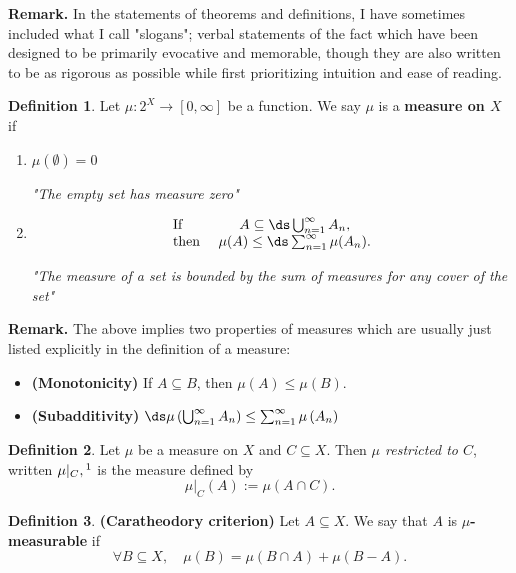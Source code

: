 \documentclass[a5paper]{article}
\theoremstyle{definition}%
\newtheorem*{definition*}{Definition}
\numberwithin{exercise}{section}
\theoremstyle{remark}%
\renewcommand{\measure}[1]{\mu\left(#1\right)}
\begin{document}
\noindent \textbf{Remark.}
In the statements of theorems and definitions, I have sometimes included what I call "slogans"; verbal statements of the fact which have been designed to be primarily evocative and memorable, though they are also written to be as rigorous as possible while first prioritizing intuition and ease of reading. 

\begin{highlight}
\begin{definition*}
	Let $\mu:2^X\to [0,\infty]$ be a function. We say $\mu$ is a \textbf{measure on $X$} if
	\begin{enumerate}[label=(\roman*)]
		\item $\mu (\emptyset)=0$
		
		\textit{"The empty set has measure zero"}
		\item \mbox{} \vspace{-16pt} 
		\[\begin{array}{lc}
		\text{If } & A \subseteq \ds\bigcup_{n=1}^\infty A_n, \\
		\text{then } & \mu(A) \leq \ds\sum_{n=1}^\infty\mu(A_n).
		\end{array}\]
		
		\textit{"The measure of a set is bounded by the sum of measures for any cover of the set"}
	\end{enumerate}
\end{definition*}
\end{highlight}

\pagebreak
\begin{highlight}
\textbf{Remark.} The above implies two properties of measures which are usually just listed explicitly in the definition of a measure:
\begin{itemize}
	\item \textbf{(Monotonicity)} If $A\subseteq B$, then $\mu(A)\leq\measure{B}$. 
	\item \textbf{(Subadditivity)} $\ds\measure{\bigcup_{n=1}^\infty A_n} \leq \sum_{n=1}^\infty	\measure{A_n}$
\end{itemize}
\end{highlight}

\begin{definition*}
Let $\mu$ be a measure on $X$ and $C\subseteq X$. Then \emph{$\mu$ restricted to $C$}, written $\mu|_C, \footnotemark$ is the measure defined by 
$$\mu|_C(A):=\measure{A\cap C}.$$
\end{definition*}
%
\begin{highlight}
\begin{definition*}\textbf{(Caratheodory criterion)} 
Let $A\subseteq X$. We say that $A$ is \textbf{$\mu$-measurable} if 
$$\forall B \subseteq X, \quad \measure{B}=\measure{B\cap A} + \measure{B - A}.$$
\end{definition*}
\end{highlight}
\end{document}
